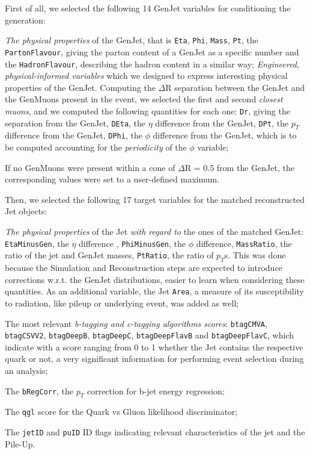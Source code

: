 First of all, we selected the following 14 GenJet variables for conditioning the generation: 

\begin{outline}
\1 \emph{The physical properties} of the GenJet, that is \texttt{Eta}, \texttt{Phi}, \texttt{Mass}, \texttt{Pt}, the \texttt{PartonFlavour}, giving the parton content of a GenJet as a specific number and the \texttt{HadronFlavour}, describing the hadron content in a similar way;
\1 \emph{Engineered, physical-informed variables} which we designed to express interesting physical properties of the GenJet. Computing the $\Delta$R separation between the GenJet and the GenMuons present in the event, we selected the first and second \emph{closest muons}, and we computed the following quantities for each one:
\2 \texttt{Dr}, giving the separation from the GenJet, \texttt{DEta}, the $\eta$ difference from the GenJet, \texttt{DPt}, the $p_T$ difference from the GenJet, \texttt{DPhi}, the $\phi$ difference from the GenJet, which is to be computed accounting for the \emph{periodicity} of the $\phi$ variable;

\1 If no GenMuons were present within a cone of $\Delta$R = 0.5 from the GenJet, the corresponding values were set to a user-defined maximum.

\end{outline}

Then, we selected the following 17 target variables for the matched reconstructed Jet objects:

\begin{outline}
\1 \emph{The physical properties} of the Jet \emph{with regard to} the ones of the matched GenJet: \texttt{EtaMinusGen}, the $\eta$ difference , \texttt{PhiMinusGen}, the $\phi$ difference, \texttt{MassRatio}, the ratio of the jet and GenJet masses, \texttt{PtRatio}, the ratio of $p_T$s. This was done because the Simulation and Reconstruction steps are expected to introduce corrections w.r.t. the GenJet distributions, easier to learn when considering these quantities. As an additional variable, the Jet \texttt{Area}, a measure of its susceptibility to radiation, like pileup or underlying event, was added as well;

\1 The most relevant \emph{b-tagging and c-tagging algorithms scores}: \texttt{btagCMVA}, \texttt{btagCSVV2}, \texttt{btagDeepB}, \texttt{btagDeepC}, \texttt{btagDeepFlavB} and \texttt{btagDeepFlavC}, which indicate with a score ranging from 0 to 1 whether the Jet contains the respective quark or not, a very significant information for performing event selection during an analysis;

\1 The \texttt{bRegCorr}, the $p_T$ correction for b-jet energy regression;

\1 The \texttt{qgl} score for the Quark vs Gluon likelihood discriminator;

\1 The \texttt{jetID} and \texttt{puID} ID flags indicating relevant characteristics of the jet and the Pile-Up.
\end{outline}

